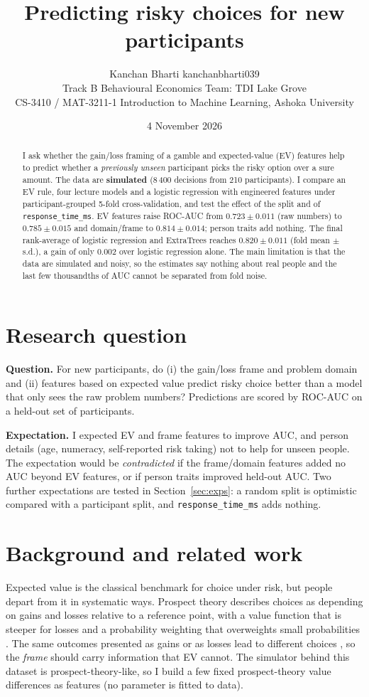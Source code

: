 \documentclass[11pt,a4paper]{article}
\title{Predicting risky choices for new participants}
\author{Kanchan Bharti \quad [5020261053] \quad kanchanbharti039\\
  \small Track B Behavioural Economics \quad
  Team: TDI Lake Grove\\
  \small CS-3410 / MAT-3211-1 Introduction to Machine Learning, Ashoka University}
\date{4 November 2026}
\begin{document}
\maketitle

\begin{abstract}
I ask whether the gain/loss framing of a gamble and expected-value (EV) features help to predict whether
a \emph{previously unseen} participant picks the risky option over a sure amount. The data are
\textbf{simulated} (8\,400 decisions from 210 participants). I compare an EV rule, four lecture models and
a logistic regression with engineered features under participant-grouped 5-fold cross-validation, and
test the effect of the split and of \texttt{response\_time\_ms}. EV features raise ROC-AUC from
$0.723\pm0.011$ (raw numbers) to $0.785\pm0.015$ and domain/frame to $0.814\pm0.014$; person traits add
nothing. The final rank-average of logistic regression and ExtraTrees reaches $0.820\pm0.011$
(fold mean $\pm$ s.d.), a gain of only $0.002$ over logistic regression alone. The main limitation is that the
data are simulated and noisy, so the estimates say nothing about real people and the last few thousandths
of AUC cannot be separated from fold noise.
\end{abstract}

\section{Research question}
\textbf{Question.} For new participants, do (i) the gain/loss frame and problem domain and (ii) features based on
expected value predict risky choice better than a model that only sees the raw problem numbers?
Predictions are scored by ROC-AUC on a held-out set of participants.

\textbf{Expectation.} I expected EV and frame features to improve AUC, and person details (age, numeracy,
self-reported risk taking) not to help for unseen people. The expectation would be \emph{contradicted} if the
frame/domain features added no AUC beyond EV features, or if person traits improved held-out AUC.
Two further expectations are tested in Section~\ref{sec:exps}: a random split is optimistic compared with a
participant split, and \texttt{response\_time\_ms} adds nothing.

\section{Background and related work}
Expected value is the classical benchmark for choice under risk, but people depart from it in systematic ways.
Prospect theory describes choices as depending on gains and losses relative to a reference point, with a value
function that is steeper for losses and a probability weighting that overweights small probabilities
\citep{kahneman1979,tversky1992}. The same outcomes presented as gains or as losses lead to different choices
\citep{tversky1981}, so the \emph{frame} should carry information that EV cannot. The simulator behind this
dataset is prospect-theory-like, so I build a few fixed prospect-theory value differences as features (no
parameter is fitted to data).
\end{document}
